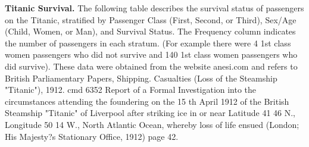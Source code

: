 \documentclass{article}
\begin{document}
\pagebreak 
\textbf{Titanic Survival.} The following table describes the survival status of passengers on the Titanic, stratified by Passenger Class (First, Second, or Third), Sex/Age (Child, Women, or Man), and Survival Status. The Frequency column indicates the number of passengers in each stratum. (For example there were 4 1st class women passengers who did not survive and 140 1st class women passengers who did survive). These data were obtained from the website anesi.com and refers to British Parliamentary Papers, Shipping. Casualties (Loss of the Steamship "Titanic"), 1912. cmd 6352 Report of a Formal Investigation into the circumstances attending the foundering on the 15 th April 1912 of the British Steamship "Titanic" of Liverpool after striking ice in or near Latitude 41 46 N., Longitude 50 14 W., North Atlantic Ocean, whereby loss of life ensued (London; His Majesty?s Stationary Office, 1912) page 42.\\
\end{document}
